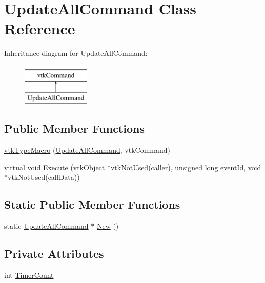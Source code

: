 \hypertarget{classUpdateAllCommand}{}\section{Update\+All\+Command Class Reference}
\label{classUpdateAllCommand}
Inheritance diagram for Update\+All\+Command\+:\begin{figure}[H]
\begin{center}
\leavevmode
\includegraphics[height=2.000000cm]{classUpdateAllCommand}
\end{center}
\end{figure}
\subsection*{Public Member Functions}
\begin{DoxyCompactItemize}
\item 
\mbox{\hyperlink{classUpdateAllCommand_a228565b2a2306d425dc7eb3cda4d39a4}{vtk\+Type\+Macro}} (\mbox{\hyperlink{classUpdateAllCommand}{Update\+All\+Command}}, vtk\+Command)
\item 
virtual void \mbox{\hyperlink{classUpdateAllCommand_a0a2dab315be55642c65d7fa1b2892ec8}{Execute}} (vtk\+Object $\ast$vtk\+Not\+Used(caller), unsigned long event\+Id, void $\ast$vtk\+Not\+Used(call\+Data))
\end{DoxyCompactItemize}
\subsection*{Static Public Member Functions}
\begin{DoxyCompactItemize}
\item 
static \mbox{\hyperlink{classUpdateAllCommand}{Update\+All\+Command}} $\ast$ \mbox{\hyperlink{classUpdateAllCommand_a97cd6ef1c68bb473aef27c898b175517}{New}} ()
\end{DoxyCompactItemize}
\subsection*{Private Attributes}
\begin{DoxyCompactItemize}
\item 
int \mbox{\hyperlink{classUpdateAllCommand_a66ba9400072105306ca48a58470014dc}{Timer\+Count}}
\end{DoxyCompactItemize}


